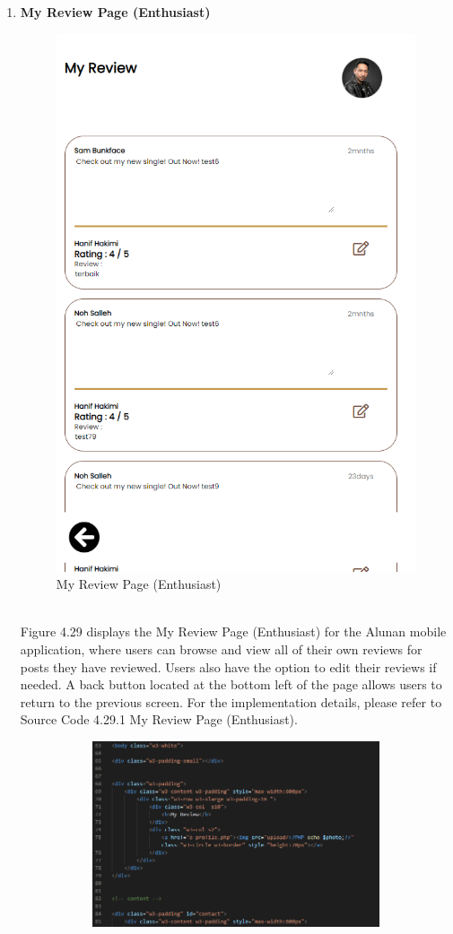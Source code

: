 \begin{enumerate}[1.]
    \item \textbf{My Review Page (Enthusiast)}
    \begin{figure}[h]
        \centering
        \includegraphics[width=0.5\linewidth]{mainmatter/images/frontend/ss/My Review (Enthusiast).png}
        \caption{My Review Page (Enthusiast)}
        \label{fig:myfig68}
    \end{figure} \\
    Figure 4.29 displays the My Review Page (Enthusiast) for the Alunan mobile application, where users can browse and view all of their own reviews for posts they have reviewed. Users also have the option to edit their reviews if needed. A back button located at the bottom left of the page allows users to return to the previous screen. For the implementation details, please refer to Source Code 4.29.1 My Review Page (Enthusiast).
    \clearpage
    \begin{figure}[h]\ContinuedFloat
        \centering
        \begin{subfigure}[b]{0.7\textwidth}
            \centering
            \includegraphics[width=\textwidth]{mainmatter/images/frontend/code/emyreview.png}

\end{subfigure}
\end{figure}
\end{enumerate}
